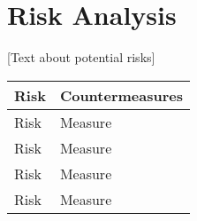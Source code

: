 \documentclass[lang=english,inputenc=utf8,fontsize=10pt]{ldvarticle}
\begin{document}
\section{Risk Analysis}

[Text about potential risks] \lipsum[4-5]

\begin{center}
	\begin{footnotesize}
		\setlength{\arrayrulewidth}{1,05pt}
		\begin{tabular}[htb]{|p{5cm}|p{7.1cm}|}
			\hline
			\textbf{Risk} & \textbf{Countermeasures} \\
			\hline
			\hline
			\rowcolor{lightgray} Risk & Measure \\
			\hline
			\rowcolor{lightgray} Risk & Measure \\
			\hline	
			\rowcolor{lightgray} Risk & Measure \\
			\hline
			\rowcolor{lightgray} Risk & Measure \\
			\hline	
		\end{tabular}
	\end{footnotesize}
\end{center}
\end{document}
